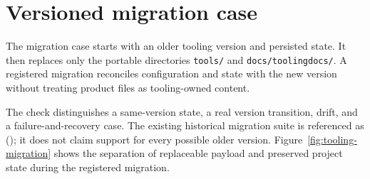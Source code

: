 \section{Versioned migration case}
\label{chap:versioned-migration-case}

The migration case starts with an older tooling version and persisted state. It then
replaces only the portable directories \texttt{tools/} and \texttt{docs/toolingdocs/}.
A registered migration reconciles configuration and state with the new version without
treating product files as tooling-owned content.

The check distinguishes a same-version state, a real version transition, drift, and a
failure-and-recovery case. The existing historical migration suite is referenced as
\Verified{} (); it does not claim support for every possible
older version.
Figure~\ref{fig:tooling-migration} shows the separation of replaceable payload and
preserved project state during the registered migration.


